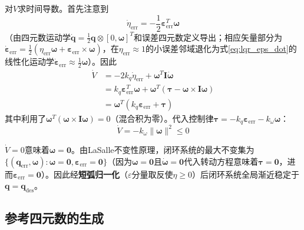 对$V$求时间导数。首先注意到
\begin{equation}
    \dot{\eta}_{\text{err}} = -\frac{1}{2}\boldsymbol{\varepsilon}_{\text{err}}^T \boldsymbol{\omega}
    \label{eq:eta_dot}
\end{equation}
（由四元数运动学$\dot{\mathbf{q}} = \frac{1}{2}\mathbf{q}\otimes[0,\boldsymbol{\omega}]^T$和误差四元数定义导出；相应矢量部分为$\dot{\boldsymbol{\varepsilon}}_{\text{err}}=\frac{1}{2}(\eta_{\text{err}}\boldsymbol{\omega}+\boldsymbol{\varepsilon}_{\text{err}}\times\boldsymbol{\omega})$，在$\eta_{\text{err}}\approx1$的小误差邻域退化为式\ref{eq:lqr_eps_dot}的线性化运动学$\dot{\boldsymbol{\varepsilon}}_{\text{err}}\approx\frac{1}{2}\boldsymbol{\omega}$）。因此
\begin{align}
    \dot{V} &= -2k_q\dot{\eta}_{\text{err}} + \boldsymbol{\omega}^T \mathbf{I} \dot{\boldsymbol{\omega}} \nonumber \\
            &= k_q \boldsymbol{\varepsilon}_{\text{err}}^T \boldsymbol{\omega} + \boldsymbol{\omega}^T(\boldsymbol{\tau} - \boldsymbol{\omega}\times\mathbf{I}\boldsymbol{\omega}) \nonumber \\
            &= \boldsymbol{\omega}^T(k_q \boldsymbol{\varepsilon}_{\text{err}} + \boldsymbol{\tau}) \label{eq:Vdot_intermediate}
\end{align}
其中利用了$\boldsymbol{\omega}^T(\boldsymbol{\omega}\times\mathbf{I}\boldsymbol{\omega})=0$（混合积为零）。代入控制律$\boldsymbol{\tau} = -k_q\boldsymbol{\varepsilon}_{\text{err}} - k_\omega\boldsymbol{\omega}$：
\begin{equation}
    \boxed{\dot{V} = -k_\omega \|\boldsymbol{\omega}\|^2 \leq 0}
    \label{eq:Vdot_final}
\end{equation}

$\dot{V}=0$意味着$\boldsymbol{\omega}=\mathbf{0}$。由LaSalle不变性原理，闭环系统的最大不变集为$\{(\mathbf{q}_{\text{err}}, \boldsymbol{\omega}) : \boldsymbol{\omega}=\mathbf{0}, \boldsymbol{\varepsilon}_{\text{err}}=\mathbf{0}\}$（因为$\boldsymbol{\omega}=\mathbf{0}$且$\dot{\boldsymbol{\omega}}=\mathbf{0}$代入转动方程意味着$\boldsymbol{\tau}=\mathbf{0}$，进而$\boldsymbol{\varepsilon}_{\text{err}}=\mathbf{0}$）。因此经\textbf{短弧归一化}（$\varepsilon$分量取反使$\eta\geq0$）后闭环系统全局渐近稳定于$\mathbf{q} = \mathbf{q}_{\text{des}}$。

\subsection{参考四元数的生成}

